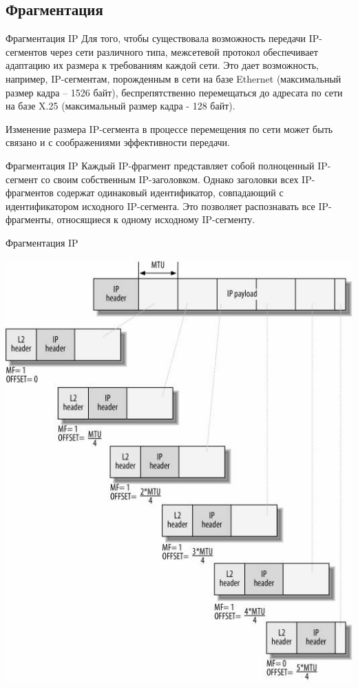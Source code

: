 \subsection{Фрагментация}
\begin{frame}{Фрагментация IP}
Для того,  чтобы существовала возможность передачи IP-сегментов через сети различного типа,  
межсетевой протокол обеспечивает адаптацию их размера к требованиям каждой сети. Это дает возможность,  
например,  IP-сегментам,  порожденным в сети на базе Ethernet (максимальный размер кадра -- 1526 байт),  
беспрепятственно перемещаться до адресата по сети на базе X.25 (максимальный размер кадра - 128 байт). 

Изменение размера IP-сегмента в процессе перемещения по сети может быть связано и с соображениями эффективности передачи.	
\end{frame}

\begin{frame}{Фрагментация IP}
Каждый IP-фрагмент представляет собой полноценный IP-сегмент со своим собственным IP-заголовком. 
Однако заголовки всех IP-фрагментов содержат одинаковый идентификатор,  
совпадающий с идентификатором исходного IP-сегмента. Это позволяет распознавать все IP-фрагменты,  относящиеся к одному исходному IP-сегменту.	
\end{frame}

\begin{frame}{Фрагментация IP}
	\begin{center}
		\includegraphics[height=0.8\textheight]{03-ip_fragmentation.png}
	\end{center}
\end{frame}

